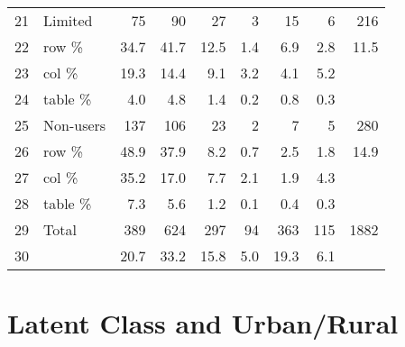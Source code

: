 \documentclass{article}
\begin{document}
\begin{table}[ht]
\begin{tabular}{llrrrrrrr}
  21 & Limited & 75 & 90 & 27 & 3 & 15 & 6 & 216 \\ 
  22 & row \% & 34.7 & 41.7 & 12.5 & 1.4 & 6.9 & 2.8 & 11.5 \\ 
  23 & col \% & 19.3 & 14.4 & 9.1 & 3.2 & 4.1 & 5.2 &  \\ 
  24 & table \% & 4.0 & 4.8 & 1.4 & 0.2 & 0.8 & 0.3 &  \\ 
  25 & Non-users & 137 & 106 & 23 & 2 & 7 & 5 & 280 \\ 
  26 & row \% & 48.9 & 37.9 & 8.2 & 0.7 & 2.5 & 1.8 & 14.9 \\ 
  27 & col \% & 35.2 & 17.0 & 7.7 & 2.1 & 1.9 & 4.3 &  \\ 
  28 & table \% & 7.3 & 5.6 & 1.2 & 0.1 & 0.4 & 0.3 &  \\ 
  29 & Total & 389 & 624 & 297 & 94 & 363 & 115 & 1882 \\ 
  30 &  & 20.7 & 33.2 & 15.8 & 5.0 & 19.3 & 6.1 &  \\ 
   \hline
\end{tabular}
\end{table}

\section{Latent Class and Urban/Rural}
\end{document}
